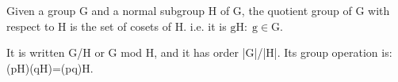 Given a group G and a normal subgroup H of G, the quotient group of G with
respect to H is the set of cosets of H. i.e. it is $ { \mathrm{gH} : \;
\mathrm{g} \in \mathrm{G} . } $
\par
It is written G/H or G mod H, and it has order |G|/|H|. Its group operation
is: (pH)(qH)=(pq)H.

